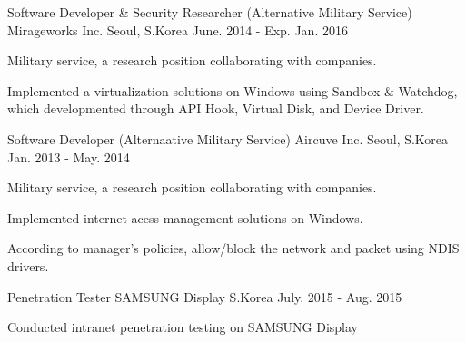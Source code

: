 \begin{cventries}
  \cventry
    {Software Developer \& Security Researcher (Alternative Military Service)}
    {Mirageworks Inc.}
    {Seoul, S.Korea}
    {June. 2014 - Exp. Jan. 2016}
    {
      \begin{cvitems}
        \item {Military service, a research position collaborating with companies.}
        \item {Implemented a virtualization solutions on Windows using Sandbox \& Watchdog, which developmented through API Hook, Virtual Disk, and Device Driver.}
      \end{cvitems}
    }
  \cventry
    {Software Developer (Alternaative Military Service)}
    {Aircuve Inc.}
    {Seoul, S.Korea}
    {Jan. 2013 - May. 2014}
    {
      \begin{cvitems}
        \item {Military service, a research position collaborating with companies.}
        \item {Implemented internet acess management solutions on Windows.}
        \item {According to manager's policies, allow/block the network and packet using NDIS drivers.}
      \end{cvitems}
    }
  \cventry
    {Penetration Tester}
    {SAMSUNG Display}
    {S.Korea}
    {July. 2015 - Aug. 2015}
    {
      \begin{cvitems}
        \item {Conducted intranet penetration testing on SAMSUNG Display}
      \end{cvitems} 
    }
\end{cventries}
